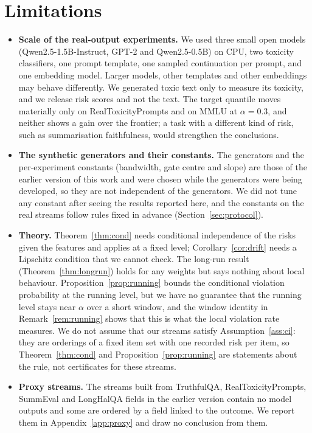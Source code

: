 \section{Limitations}\label{sec:limits}

\begin{itemize}[nosep]
  \item \textbf{Scale of the real-output experiments.} We used three small open models (Qwen2.5-1.5B-Instruct, GPT-2 and Qwen2.5-0.5B) on CPU, two toxicity classifiers, one prompt template, one sampled continuation per prompt, and one embedding model. Larger models, other templates and other embeddings may behave differently. We generated toxic text only to measure its toxicity, and we release risk scores and not the text. The target quantile moves materially only on RealToxicityPrompts and on MMLU at $\alpha=0.3$, and neither shows a gain over the frontier; a task with a different kind of risk, such as summarisation faithfulness, would strengthen the conclusions.
  \item \textbf{The synthetic generators and their constants.} The generators and the per-experiment constants (bandwidth, gate centre and slope) are those of the earlier version of this work and were chosen while the generators were being developed, so they are not independent of the generators. We did not tune any constant after seeing the results reported here, and the constants on the real streams follow rules fixed in advance (Section~\ref{sec:protocol}).
  \item \textbf{Theory.} Theorem~\ref{thm:cond} needs conditional independence of the risks given the features and applies at a fixed level; Corollary~\ref{cor:drift} needs a Lipschitz condition that we cannot check. The long-run result (Theorem~\ref{thm:longrun}) holds for any weights but says nothing about local behaviour. Proposition~\ref{prop:running} bounds the conditional violation probability at the running level, but we have no guarantee that the running level stays near $\alpha$ over a short window, and the window identity in Remark~\ref{rem:running} shows that this is what the local violation rate measures. We do not assume that our streams satisfy Assumption~\ref{ass:ci}: they are orderings of a fixed item set with one recorded risk per item, so Theorem~\ref{thm:cond} and Proposition~\ref{prop:running} are statements about the rule, not certificates for these streams.
  \item \textbf{Proxy streams.} The streams built from TruthfulQA, RealToxicityPrompts, SummEval and LongHalQA fields in the earlier version contain no model outputs and some are ordered by a field linked to the outcome. We report them in Appendix~\ref{app:proxy} and draw no conclusion from them.

\end{itemize}
